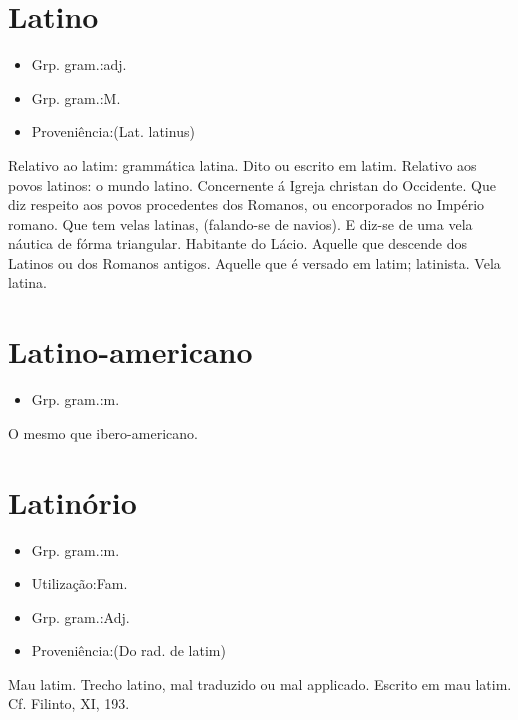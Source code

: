 \section{Latino}
\begin{itemize}
\item {Grp. gram.:adj.}
\end{itemize}
\begin{itemize}
\item {Grp. gram.:M.}
\end{itemize}
\begin{itemize}
\item {Proveniência:(Lat. \textunderscore latinus\textunderscore )}
\end{itemize}
Relativo ao latim: \textunderscore grammática latina\textunderscore .
Dito ou escrito em latim.
Relativo aos povos latinos: \textunderscore o mundo latino\textunderscore .
Concernente á Igreja christan do Occidente.
Que diz respeito aos povos procedentes dos Romanos, ou encorporados no Império romano.
Que tem velas latinas, (falando-se de navios).
E diz-se de uma vela náutica de fórma triangular.
Habitante do Lácio.
Aquelle que descende dos Latinos ou dos Romanos antigos.
Aquelle que é versado em latim; latinista.
Vela latina.
\section{Latino-americano}
\begin{itemize}
\item {Grp. gram.:m.}
\end{itemize}
O mesmo que \textunderscore ibero-americano\textunderscore .
\section{Latinório}
\begin{itemize}
\item {Grp. gram.:m.}
\end{itemize}
\begin{itemize}
\item {Utilização:Fam.}
\end{itemize}
\begin{itemize}
\item {Grp. gram.:Adj.}
\end{itemize}
\begin{itemize}
\item {Proveniência:(Do rad. de \textunderscore latim\textunderscore )}
\end{itemize}
Mau latim.
Trecho latino, mal traduzido ou mal applicado.
Escrito em mau latim. Cf. Filinto, XI, 193.
